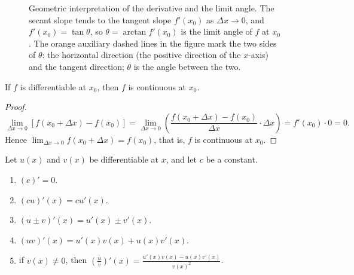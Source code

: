 \begin{figure}[htbp]
\caption{Geometric interpretation of the derivative and the limit angle. The secant slope tends to the tangent slope $f'(x_0)$ as $\Delta x \to 0$, and $f'(x_0)=\tan\theta$, so $\theta=\arctan f'(x_0)$ is the limit angle of $f$ at $x_0$. The orange auxiliary dashed lines in the figure mark the two sides of $\theta$: the horizontal direction (the positive direction of the $x$-axis) and the tangent direction; $\theta$ is the angle between the two.}
\label{fig:derivative_limit_angle}
\end{figure}

\begin{proposition}\label{prop:diff_implies_cont}
If $f$ is differentiable at $x_0$, then $f$ is continuous at $x_0$.
\end{proposition}

\begin{proof}
\[
\lim_{\Delta x \to 0} [f(x_0+\Delta x) - f(x_0)] = \lim_{\Delta x \to 0} \left( \frac{f(x_0+\Delta x) - f(x_0)}{\Delta x} \cdot \Delta x \right) = f'(x_0) \cdot 0 = 0.
\]
Hence $\lim_{\Delta x \to 0} f(x_0+\Delta x) = f(x_0)$, that is, $f$ is continuous at $x_0$.
\end{proof}

\begin{theorem}\label{thm:derivative_rules}
Let $u(x)$ and $v(x)$ be differentiable at $x$, and let $c$ be a constant.
\begin{enumerate}[label=(\roman*)]
    \item $(c)' = 0$.
    \item $(cu)'(x) = c u'(x)$.
    \item $(u \pm v)'(x) = u'(x) \pm v'(x)$.
    \item $(uv)'(x) = u'(x)v(x) + u(x)v'(x)$.
    \item if $v(x) \neq 0$, then $\left(\frac{u}{v}\right)'(x) = \frac{u'(x)v(x) - u(x)v'(x)}{v(x)^2}$.
\end{enumerate}
\end{theorem}

